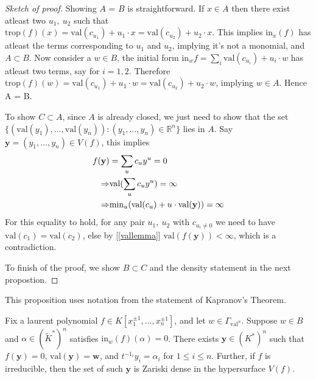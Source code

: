     \begin{proof}[Sketch of proof]
        Showing $A$ = $B$ is straightforward. 
        If $x \in A$ then there exist atleast two $u_1,~u_2$ such that $\text{trop}(f)(x) = \text{val}(c_{u_{1}}) + u_{1}\cdot x = \text{val}(c_{u_{2}}) + u_{2}\cdot x$. 
        This implies $\text{in}_{x}(f)$ has atleast the terms corresponding to $u_1$ and $u_2$, implying it's not a monomial, and $A \subset B$.
        Now consider a $w \in B$, the initial form $\text{in}_{w}f = \sum_i \text{val}(c_{u_{i}}) + u_i \cdot w$ has atleast two terms, say for $i=1,2$. 
        Therefore $\text{trop}(f)(w) = \text{val}(c_{u_{1}}) + u_{1}\cdot w = \text{val}(c_{u_{2}}) + u_{2}\cdot w$, implying $w \in A$.
        Hence A = B.
        \par To show $C \subset A$, since $A$ is already closed, we just need to show that the set $\{(\text{val}(y_1), \dots, \text{val}(y_n)): (y_1,\dots, y_n) \in \mathbb{R}^{n}\}$ lies in $A$. Say $\textbf{y} = (y_1,\dots,y_n) \in V(f)$, this implies 
        \begin{align*}
            f(\textbf{y}) &= \sum_u c_u y^{u} = 0 \\
            \Rightarrow&\text{val}(\sum_u c_u y^{u}) = \infty \\
            \Rightarrow& \text{min}_u(\text{val}(c_u) + u \cdot \text{val(\textbf{y})}) = \infty
        \end{align*}
        For this equality to hold, for any pair $u_{1},~u_{2}$ with $c_{u_{i} \neq 0}$ we need to have $\text{val}(c_1) = \text{val}(c_2)$, else by [\ref{vallemma}] $\text{val}(f(\textbf{y})) < \infty$, which is a contradiction. 
        \par To finish of the proof, we show $B \subset C$ and the density statement in the next propostion.
    \end{proof}
    This proposition uses notation from the statement of Kapranov's Theorem.
    \begin{proposition}
        Fix a laurent polynomial $f \in  K[x_{1}^{\pm1}, \dots, x_{n}^{\pm1}]$, and let $w \in \Gamma_{\text{val}^{n}}$. 
        Suppose $w \in B$ and $\alpha \in (\tilde{K}^{*})^{n}$ satisfies $\text{in}_{w}(f)(\alpha) = 0$. 
        There exists $\textbf{y} \in (K^{*})^{n}$ such that $f(\textbf{y}) = 0$,  $\text{val}(\textbf{y}) = \textbf{w}$, and $t^{-1_{i}}y_{i}=\alpha_{i}$ for $1 \leq i \leq n$.
        Further, if $f$ is irreducible, then the set of such $\textbf{y}$ is Zariski dense in the hypersurface $V(f)$.
    \end{proposition}
